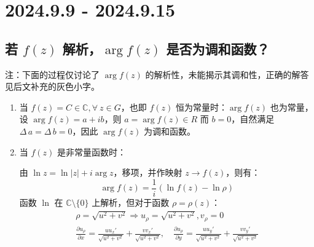 \documentclass[UTF8]{report}
\def\C{\mathbb{C}}
\theoremstyle{MyLineTheoremStyle} %
\theoremstyle{MyBlockTheoremStyle} %
\theoremstyle{MySubsubsectionStyle} %
\begin{document}
\chapter{2024.9.9 - 2024.9.15}\thispagestyle{fancy}

\section{若 $f(z)$ 解析，$\arg f(z)$ 是否为调和函数？}

{\par\color{gray}\small
注：下面的过程仅讨论了 $\arg f(z)$ 的解析性，未能揭示其调和性，正确的解答见后文补充的灰色小字。
\par}


\begin{enumerate}
\item 当 $f(z) = C \in \C, \forall\ z \in G$，也即 $f(z)$ 恒为常量时：$\arg f(z)$ 也为常量，设 $\arg f(z) = a + ib$，则 $a = \arg f(z) \in R$ 而 $b=0$，自然满足 $\Delta\, a = \Delta\, b =0$，因此 $\arg f(z)$ 为调和函数。
\item 当 $f(z)$ 是非常量函数时：

由 $\ln z = \ln | z | + i\arg z$，移项，并作映射 $z \to f(z)$，则有：
\begin{equation*}
\arg f(z) = \frac{1}{i}\left(\ln f(z) - \ln \rho\right)
\end{equation*}
函数 $\ln$ 在 $\C \setminus \{0\}$ 上解析，但对于函数 $\rho = \rho(z)$：
\begin{gather}
\rho = \sqrt{u^2 + v^2}\Longrightarrow u_\rho = \sqrt{u^2+v^2}, v_\rho = 0  \\ 
\frac{\partial u_\rho }{\partial x }
= \frac{uu_x'}{\sqrt{u^2+v^2} } + \frac{vv_x'}{\sqrt{u^2+v^2} },\quad \frac{\partial u_\rho }{\partial y } = \frac{uu_y'}{\sqrt{u^2+v^2} } + \frac{vv_y'}{\sqrt{u^2+v^2} }
\end{gather}


\end{enumerate}
\end{document}
